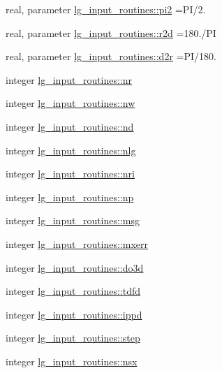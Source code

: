 \begin{DoxyCompactItemize}
real, parameter \hyperlink{namespacelg__input__routines_a6274a2779db9ccb43e23b33ea759ed09}{lg\+\_\+input\+\_\+routines\+::pi2} =PI/2.
\item 
real, parameter \hyperlink{namespacelg__input__routines_a25c56d53596a755b2c9f8bc95595bdde}{lg\+\_\+input\+\_\+routines\+::r2d} =180./PI
\item 
real, parameter \hyperlink{namespacelg__input__routines_a17c7af951ca7d0cf40e35d63cadf6d43}{lg\+\_\+input\+\_\+routines\+::d2r} =PI/180.
\item 
integer \hyperlink{namespacelg__input__routines_abad63a3f02d5381de7890e436e450ca6}{lg\+\_\+input\+\_\+routines\+::nr}
\item 
integer \hyperlink{namespacelg__input__routines_a1184bd0c1a23b793999aa5ae8df45410}{lg\+\_\+input\+\_\+routines\+::nw}
\item 
integer \hyperlink{namespacelg__input__routines_aad696affac93d988d4b792cdfaccf874}{lg\+\_\+input\+\_\+routines\+::nd}
\item 
integer \hyperlink{namespacelg__input__routines_a2b185a6190d1157ccb7596a980ddeee2}{lg\+\_\+input\+\_\+routines\+::nlg}
\item 
integer \hyperlink{namespacelg__input__routines_a1d104fe3ddbda17fb2f63b3d483143f8}{lg\+\_\+input\+\_\+routines\+::nri}
\item 
integer \hyperlink{namespacelg__input__routines_a1f4753d84cde284fc19867e152298c89}{lg\+\_\+input\+\_\+routines\+::np}
\item 
integer \hyperlink{namespacelg__input__routines_a8156420c85f94edf75fe7cc28ec9c826}{lg\+\_\+input\+\_\+routines\+::msg}
\item 
integer \hyperlink{namespacelg__input__routines_abe4359e93c3a6a113806a9c696d6ecfd}{lg\+\_\+input\+\_\+routines\+::mxerr}
\item 
integer \hyperlink{namespacelg__input__routines_af78f7591d1f55c4a9a6aec78bdafb61c}{lg\+\_\+input\+\_\+routines\+::do3d}
\item 
integer \hyperlink{namespacelg__input__routines_a2eaf0660c29a584e802dcdf7aeaf8fed}{lg\+\_\+input\+\_\+routines\+::tdfd}
\item 
integer \hyperlink{namespacelg__input__routines_a4eb4ee97a7b4d0a162e4c92b3c592678}{lg\+\_\+input\+\_\+routines\+::ippd}
\item 
integer \hyperlink{namespacelg__input__routines_ab6c33e83097a9da89df8e7619e39db79}{lg\+\_\+input\+\_\+routines\+::step}
\item 
integer \hyperlink{namespacelg__input__routines_a824421dcc2d27ef1019d96edca43973b}{lg\+\_\+input\+\_\+routines\+::nsx}

\end{DoxyCompactItemize}
